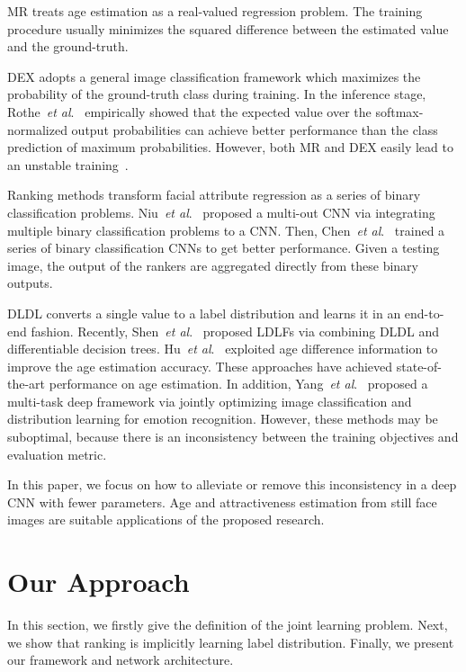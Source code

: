 \documentclass[5p,times,twocolumn]{elsarticle}
\makeatletter
\DeclareRobustCommand\onedot{\@onedot}
\def\@onedot{.}
\def\etal{\emph{et al}\onedot}
\makeatother
\begin{document}
MR treats age estimation as a real-valued regression problem. The training procedure usually minimizes the squared difference between the estimated value and the ground-truth.

DEX adopts a general image classification framework which maximizes the probability of the ground-truth class during training. In the inference stage, Rothe~\etal~\cite{rothe2016deep} empirically showed that the expected value over the softmax-normalized output probabilities can achieve better performance than the class prediction of maximum probabilities. However, both MR and DEX easily lead to an unstable training~\cite{gao2017deep}.

Ranking methods transform facial attribute regression as a series of binary classification problems. Niu~\etal~\cite{niu2016ordinal} proposed a multi-out CNN via integrating multiple binary classification problems to a CNN. Then, Chen~\etal ~\cite{chen2017using,Chen2017Deep} trained a series of binary classification CNNs to get better performance. Given a testing image, the output of the rankers are aggregated directly from these binary outputs. 

DLDL converts a single value to a label distribution and learns it in an end-to-end fashion. Recently, Shen~\etal~\cite{shen2017label} proposed LDLFs via combining DLDL and differentiable decision trees. Hu~\etal~\cite{hu2017facial} exploited age difference information to improve the age estimation accuracy. These approaches have achieved state-of-the-art performance on age estimation. In addition, Yang~\etal~\cite{yangjoint} proposed a multi-task deep framework via jointly optimizing image classification and distribution learning for emotion recognition. However, these methods may be suboptimal, because there is an inconsistency between the training objectives and evaluation metric.

In this paper, we focus on how to alleviate or remove this inconsistency in a deep CNN with fewer parameters. Age and attractiveness estimation from still face images are suitable applications of the proposed research.

\section{Our Approach}\label{sec:oa}
In this section, we firstly give the definition of the joint learning  problem. Next, we show that ranking is implicitly learning label distribution. Finally, we present our framework and network architecture.
\end{document}
